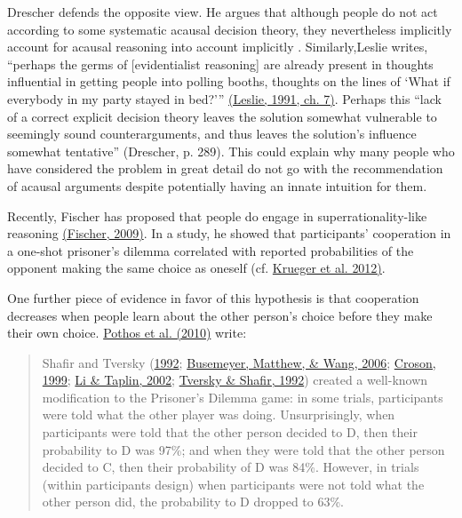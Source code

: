 Drescher defends the opposite view. He
argues that although people do not act according to some systematic
acausal decision theory, they nevertheless implicitly account for
acausal reasoning into account implicitly \citeyear{Drescher2006-ky}. Similarly,Leslie
writes, ``perhaps the germs of {[}evidentialist
reasoning{]} are already present in thoughts influential in getting
people into polling booths, thoughts on the lines of `What if everybody in my party stayed in
bed?'''
\href{https://sl4librarian.files.wordpress.com/2016/12/two-bird-deaths-one-throw-leslie.pdf}{(Leslie,
1991, ch. 7)}. Perhaps this ``lack of a correct explicit decision theory leaves the solution
somewhat vulnerable to seemingly sound counterarguments, and thus leaves the solution's influence
somewhat tentative'' (Drescher, p. 289). This could explain why many people who have considered the
problem in great detail do not go with the recommendation of acausal arguments despite potentially
having an innate intuition for them.

Recently, Fischer has proposed that people do engage in superrationality-like
reasoning
\href{http://citeseerx.ist.psu.edu/viewdoc/download?doi=10.1.1.408.464\&rep=rep1\&type=pdf}{(Fischer,
2009)}. In a study, he showed that participants' cooperation in a one-shot prisoner's dilemma
correlated with reported probabilities of
the opponent making the same choice as oneself (cf.
\href{https://sl4librarian.files.wordpress.com/2017/01/krueger2012-social-projection.pdf}{Krueger
et al. 2012)}.

One further piece of evidence in favor of this hypothesis is that
cooperation decreases when people learn about the other person's choice
before they make their own choice.
\href{https://www.researchgate.net/publication/222823221_Understanding_cooperation_in_the_Prisoner\%27s_Dilemma_game}{Pothos
et al. (2010)} write:

\begin{quote}
Shafir and Tversky
(\href{http://citeseerx.ist.psu.edu/viewdoc/download?doi=10.1.1.371.8926\&rep=rep1\&type=pdf\#page=720}{1992};
\href{http://bacon.umcs.lublin.pl/~lukasik/wp-content/uploads/2010/12/A-Quantum-Information-Processing-p131.pdf}{Busemeyer,
Matthew, \& Wang, 2006};
\href{http://citeseerx.ist.psu.edu/viewdoc/download?doi=10.1.1.318.6368\&rep=rep1\&type=pdf}{Croson,
1999};
\href{https://www.researchgate.net/publication/285712430_Examining_whether_there_is_a_disjunction_effect_in_prisoner\%27s_dilemma_games}{Li
\& Taplin, 2002};
\href{https://www.researchgate.net/publication/240286082_The_Disjunction_Effect_in_Choice_Under_Uncertainty}{Tversky
\& Shafir, 1992}) created a well-known modification to the Prisoner's
Dilemma game: in some trials, participants were told what the other
player was doing. Unsurprisingly, when participants were told that the
other person decided to D, then their probability to D was 97\%; and
when they were told that the other person decided to C, then their
probability of D was 84\%. However, in trials (within participants
design) when participants were not told what the other person did, the
probability to D dropped to 63\%.
\end{quote}

